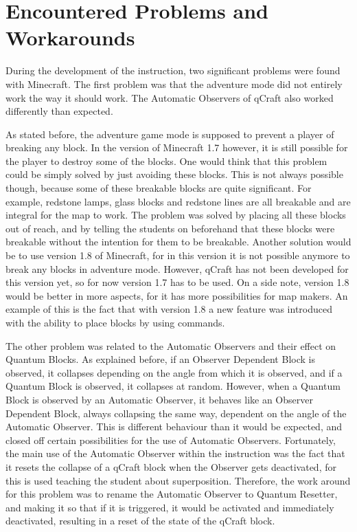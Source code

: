 \documentclass[11pt,twoside]{report} %
\begin{document}
\chapter{Encountered Problems and Workarounds}

During the development of the instruction, two significant problems were found with Minecraft. The first problem was that the adventure mode did not entirely work the way it should work. The Automatic Observers of qCraft also worked differently than expected.

As stated before, the adventure game mode is supposed to prevent a player of breaking any block. In the version of Minecraft 1.7 however, it is still possible for the player to destroy some of the blocks. One would think that this problem could be simply solved by just avoiding these blocks. This is not always possible though, because some of these breakable blocks are quite significant. For example, redstone lamps, glass blocks and redstone lines are all breakable and are integral for the map to work. The problem was solved by placing all these blocks out of reach, and by telling the students on beforehand that these blocks were breakable without the intention for them to be breakable. Another solution would be to use version 1.8 of Minecraft, for in this version it is not possible anymore to break any blocks in adventure mode. However, qCraft has not been developed for this version yet, so for now version 1.7 has to be used. On a side note, version 1.8 would be better in more aspects, for it has more possibilities for map makers. An example of this is the fact that with version 1.8 a new feature was introduced with the ability to place blocks by using commands.

The other problem was related to the Automatic Observers and their effect on Quantum Blocks. As explained before, if an Observer Dependent Block is observed, it collapses depending on the angle from which it is observed, and if a Quantum Block is observed, it collapses at random. However, when a Quantum Block is observed by an Automatic Observer, it behaves like an Observer Dependent Block, always collapsing the same way, dependent on the angle of the Automatic Observer. This is different behaviour than it would be expected, and closed off certain possibilities for the use of Automatic Observers. Fortunately, the main use of the Automatic Observer within the instruction was the fact that it resets the collapse of a qCraft block when the Observer gets deactivated, for this is used teaching the student about superposition. Therefore, the work around for this problem was to rename the Automatic Observer to Quantum Resetter, and making it so that if it is triggered, it would be activated and immediately deactivated, resulting in a reset of the state of the qCraft block.
\end{document}
